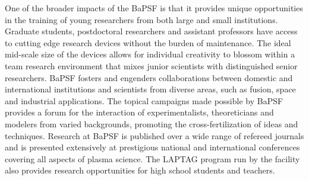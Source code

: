 \documentclass[11pt]{article}
\begin{document}
One of the broader impacts of the BaPSF is that it provides unique
opportunities in the training of young researchers from both large and
small institutions. Graduate students, postdoctoral researchers and
assistant professors have access to cutting edge research devices
without the burden of maintenance. The ideal mid-scale size of the
devices allows for individual creativity to blossom within a team
research environment that mixes junior scientists with distinguished senior
researchers. BaPSF fosters and engenders collaborations between domestic
and international institutions and scientists from diverse
areas, such as fusion, space and industrial applications. The topical
campaigns made possible by BaPSF provides a forum for the interaction of
experimentalists, theoreticians and modelers from varied backgrounds,
promoting the cross-fertilization of ideas and techniques. Research at
BaPSF is published over a wide range of refereed journals and is
presented extensively at prestigious national and international
conferences covering all aspects of plasma science. The LAPTAG program
run by the facility also provides research opportunities for high school
students and teachers.


\newpage

\setcounter{page}{1}

%
%

  
\end{document}
